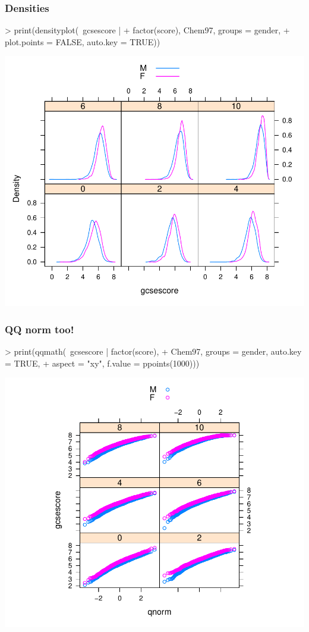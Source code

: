 \begin{frame}
  \frametitle{Densities}
\begin{Schunk}
\begin{Sinput}
> print(densityplot(~gcsescore | 
+     factor(score), Chem97, groups = gender, 
+     plot.points = FALSE, auto.key = TRUE))
\end{Sinput}
\end{Schunk}
\includegraphics{plots/fig-012}
\end{frame}

\begin{frame}
  \frametitle{QQ norm too!}
\begin{Schunk}
\begin{Sinput}
> print(qqmath(~gcsescore | factor(score), 
+     Chem97, groups = gender, auto.key = TRUE, 
+     aspect = "xy", f.value = ppoints(1000)))
\end{Sinput}
\end{Schunk}
\includegraphics{plots/fig-013}
\end{frame}

